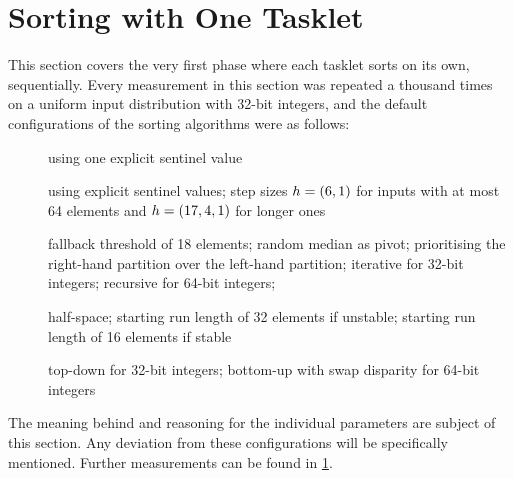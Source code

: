 \chapter{Sorting with One Tasklet}
\label{sec:tasklet}

This section covers the very first phase where each tasklet sorts on its own, \ie{} sequentially.
Every measurement in this section was repeated a thousand times on a uniform input distribution with 32-bit integers, and the default configurations of the sorting algorithms were as follows:
\begin{description}
	\item[\IS{}]
	using one explicit sentinel value

	\item[\ShS{}]
	using explicit sentinel values;
	step sizes \(h = (6, 1)\) for inputs with at most 64 elements and \(h = (17, 4, 1)\) for longer ones

	\item[\QS{}]
	fallback threshold of 18 elements;
	random median as pivot;
	prioritising the right-hand partition over the left-hand partition;
	iterative for 32-bit integers;
	recursive for 64-bit integers;

	\item[\MS{}]
	half-space;
	starting run length of 32 elements if unstable;
	starting run length of 16 elements if stable

	\item[\HS{}]
	top-down for 32-bit integers;
	bottom-up with swap disparity for 64-bit integers
\end{description}
The meaning behind and reasoning for the individual parameters are subject of this section.
Any deviation from these configurations will be specifically mentioned.
Further measurements can be found in \cref{sec:tasklet}.

\clearpage


\clearpage


\clearpage


\clearpage


\clearpage


\clearpage

